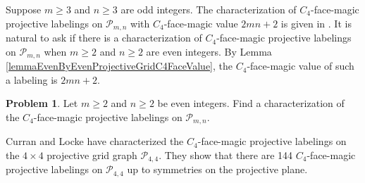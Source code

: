 \documentclass[12pt]{amsart}
\theoremstyle{definition}
\newtheorem{problem}[definition]{Problem}
\theoremstyle{plain}
\begin{document}
Suppose $m\geqslant 3$ and $n \geqslant 3$ are odd integers.
The characterization of $C_4$-face-magic projective labelings  on $\mathcal{P}_{m,n}$ with $C_4$-face-magic value $2mn+2$
is given in \cite{Curran2}.
It is natural to ask if there is a characterization of $C_4$-face-magic projective labelings on $\mathcal{P}_{m,n}$ when $m\geqslant 2$ and
$n\geqslant 2$ are even integers.
By Lemma \ref{lemmaEvenByEvenProjectiveGridC4FaceValue}, the $C_4$-face-magic value of such a labeling is $2mn+2$.

\begin{problem}
  Let $m\geqslant 2$ and $n\geqslant 2$ be even integers.
  Find a characterization of the $C_4$-face-magic projective labelings on $\mathcal{P}_{m,n}$.
\end{problem}

Curran and Locke \cite{CurranLocke} have characterized the $C_4$-face-magic projective labelings on the $4 \times 4$ projective grid graph $\mathcal{P}_{4,4}$.
They show that there are 144 $C_4$-face-magic projective labelings on $\mathcal{P}_{4,4}$ up to symmetries on the projective plane.
\end{document}
